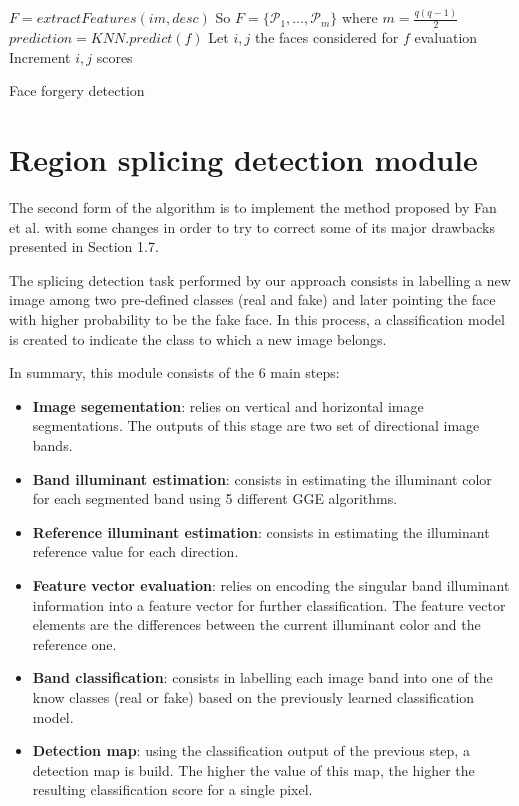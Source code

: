 \begin{algorithm}[!h]
\begin{algorithmic}[1]
\State $F = extractFeatures(im, desc)$
\State So $F = \{\mathcal{P}_1, \ldots, \mathcal{P}_m\} $ where $ m = \frac{q(q-1)}{2}$
\State $prediction = KNN.predict(f)$
\State Let $i, j$ the faces considered for $f$ evaluation
\State Increment $i, j$ scores
\EndIf
\EndFor
\EndFor
\EndFor
\end{algorithmic}\caption{Face forgery detection}\label{alg:faceforgerydetection}
\end{algorithm}

\section{Region splicing detection module}

The second form of the algorithm is to implement the method proposed by Fan et al.\cite{fan2015image} with some changes in order to try to correct some of its major drawbacks presented in Section 1.7.

The splicing detection task performed by our approach consists in labelling a new image among two pre-defined classes (real and fake) and later pointing the face with higher probability to be the fake face. In this process, a classification model is created to indicate the class to which a new image belongs.

In summary, this module consists of the 6 main steps:

\begin{itemize}
\item \textbf{Image segementation}: relies on vertical and horizontal image segmentations. The outputs of this stage are two set of directional image bands. 
\item \textbf{Band illuminant estimation}: consists in estimating the illuminant color for each segmented band using 5 different GGE algorithms.
\item \textbf{Reference illuminant estimation}: consists in estimating the illuminant reference value for each direction.
\item \textbf{Feature vector evaluation}: relies on encoding the singular band illuminant information into a feature vector for further classification. The feature vector elements are the differences between the current illuminant color and the reference one.
\item \textbf{Band classification}: consists in labelling each image band into one of the know classes (real or fake) based on the previously learned classification model.
\item \textbf{Detection map}: using the classification output of the previous step, a detection map is build. The higher the value of this map, the higher the  resulting classification score for a single pixel.
\end{itemize}

